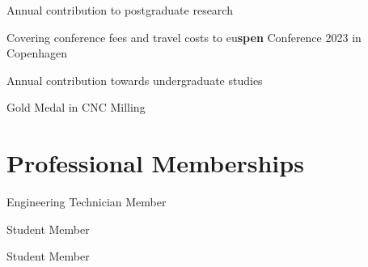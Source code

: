 \documentclass{cv}
\begin{document}
Annual contribution to postgraduate research

Covering conference fees and travel costs to eu\textbf{spen} Conference 2023 in Copenhagen 


Annual contribution towards undergraduate studies

 Gold Medal in CNC Milling 

\section{Professional Memberships}

Engineering Technician Member 

Student Member 

Student Member 
\end{document}
